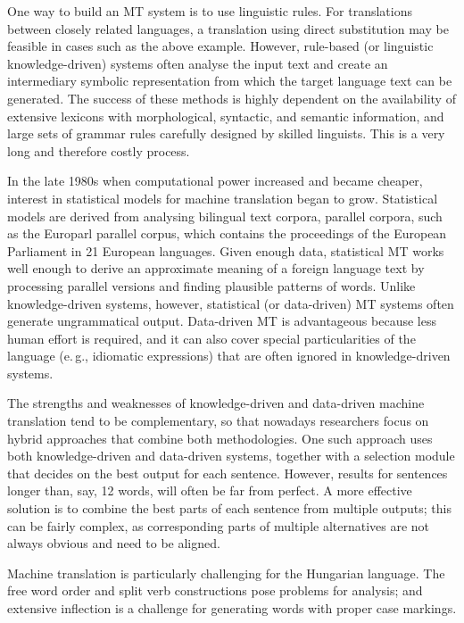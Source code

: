\begin{multicols}{2}
One way to build an MT system is to use linguistic rules. For translations between closely related languages, a translation using direct substitution may be feasible in cases such as the above example. However, rule-based (or linguistic knowledge-driven) systems often analyse the input text and create an intermediary symbolic representation from which the target language text can be generated. The success of these methods is highly dependent on the availability of extensive lexicons with morphological, syntactic, and semantic information, and large sets of grammar rules carefully designed by skilled linguists. This is a very long and therefore costly process.

In the late 1980s when computational power increased and became cheaper, interest in statistical models for machine translation began to grow. Statistical models are derived from analysing bilingual text corpora, parallel corpora, such as the Europarl parallel corpus, which contains the proceedings of the European Parliament in 21 European languages. Given enough data, statistical MT works well enough to derive an approximate meaning of a foreign language text by processing parallel versions and finding plausible patterns of words. Unlike knowledge-driven systems, however, statistical (or data-driven) MT systems often generate ungrammatical output. Data-driven MT is advantageous because less human effort is required, and it can also cover special particularities of the language (e.\,g., idiomatic expressions) that are often ignored in knowledge-driven systems. 

The strengths and weaknesses of knowledge-driven and data-driven machine translation tend to be complementary, so that nowadays researchers focus on hybrid approaches that combine both methodologies. One such approach uses both knowledge-driven and data-driven systems, together with a selection module that decides on the best output for each sentence. However, results for sentences longer than, say, 12 words, will often be far from perfect. A more effective solution is to combine the best parts of each sentence from multiple outputs; this can be fairly complex, as corresponding parts of multiple alternatives are not always obvious and need to be aligned. 


Machine translation is particularly challenging for the Hungarian language. The free word order and split verb constructions pose problems for analysis; and extensive inflection is a challenge for generating words with proper case markings.


\end{multicols}
